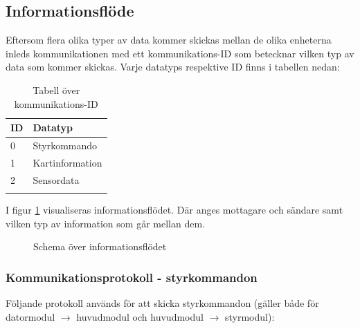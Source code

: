 \documentclass[11pt]{article}
\begin{document}
\begin{flushleft}




\subsection{Informationsflöde}
Eftersom flera olika typer av data kommer skickas mellan de olika enheterna inleds kommunikationen med ett kommunikations-ID som betecknar vilken typ av data som kommer skickas. Varje datatyps respektive ID finns i tabellen nedan:

\begin{longtable}[l]{| l | l |} \hline
\textbf{ID} & \textbf{Datatyp} \\ \hline 
0 & Styrkommando \\ \hline
1 & Kartinformation \\ \hline
2 & Sensordata \\ \hline

\caption{Tabell över kommunikations-ID}\label{kommunikationstab}
\end{longtable}

I figur \ref{informationFlow} visualiseras informationsflödet. Där anges mottagare och sändare samt vilken typ av information som går mellan dem.

\begin{figure}[htbp]
\centering
\noindent\resizebox{.8\linewidth}{!}{
	}
	\caption{Schema över informationsflödet\label{informationFlow}}	
\end{figure}

\subsubsection{Kommunikationsprotokoll - styrkommandon}
Följande protokoll används för att skicka styrkommandon (gäller både för datormodul $\rightarrow$ huvudmodul och huvudmodul $\rightarrow$ styrmodul):


\end{flushleft}
\end{document}
